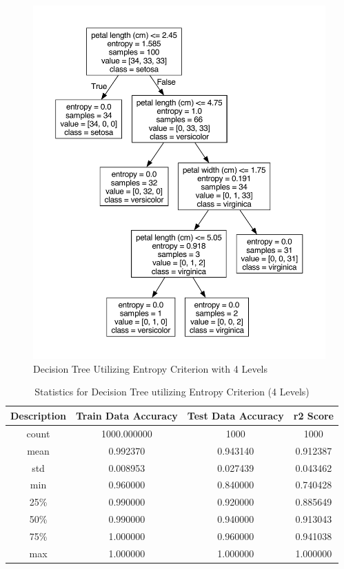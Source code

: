 \documentclass[journal]{IEEEtran}
\begin{document}
\vspace{50px}

\begin{figure}[h!]
\includegraphics[scale=0.3]{iris-entropy-4levels.pdf}
\centering
\caption{Decision Tree Utilizing Entropy Criterion with 4 Levels}
\label{fig:dtEn4}
\end{figure}

\vspace{20px}

\begin{table}[h!]
\centering
\begin{tabular}{ c | c c c }
    Description & Train Data Accuracy & Test Data Accuracy & r2 Score \\ 
\hline
count     &     1000.000000     &    1000  &1000\\
mean      &        0.992370    &        0.943140   &  0.912387\\
std       &        0.008953    &        0.027439   &  0.043462\\
min      &         0.960000    &        0.840000   &  0.740428\\
25\%      &         0.990000    &        0.920000  &   0.885649\\
50\%      &         0.990000    &        0.940000  &   0.913043\\
75\%      &         1.000000    &        0.960000  &   0.941038\\
max       &        1.000000     &       1.000000   &  1.000000
\end{tabular}
\caption{Statistics for Decision Tree utilizing Entropy Criterion (4 Levels)}
\label{table:dtEn4}
\end{table}
\end{document}

